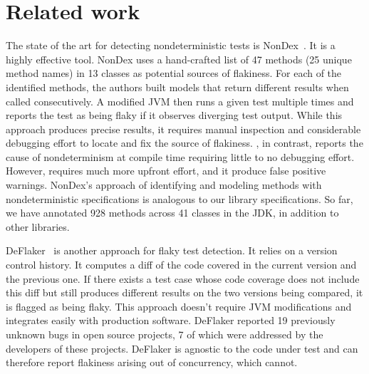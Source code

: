 \section{Related work}\label{sec:related}

The state of the art for detecting nondeterministic tests is NonDex~\cite{nondex}.  It is a highly effective tool.
NonDex uses a hand-crafted list of 47 methods (25 unique method names)
in 13 classes as potential sources of flakiness. 
For each of the identified methods, the authors built models that
return different results when called consecutively. A modified JVM then
runs a given test multiple times and reports the test as being flaky if it observes
diverging test output. While this approach produces precise results, it requires manual inspection
and considerable debugging effort to locate and fix the source of flakiness. \TheDeterminismChecker, in
contrast, reports the cause of nondeterminism at compile time requiring
little to no debugging effort.  However, \theDeterminismChecker requires
much more upfront effort, and it produce false positive warnings.
NonDex's approach of identifying and modeling methods with nondeterministic
specifications is analogous to our library specifications. So far, we have annotated
928 methods across 41 classes in the JDK, in addition to other libraries.

DeFlaker~\cite{deflaker} is another approach for flaky test detection. It
relies on a
version control history. It computes a diff of the code covered
in the current version and the previous one. If there exists a test case whose code coverage does not include
this diff but still produces different results on the two versions being compared, it is flagged as being flaky.
This approach doesn't require JVM modifications
and integrates easily with production software. DeFlaker reported 19 previously unknown bugs
in open source projects, 7 of which were addressed by the developers of these projects. DeFlaker is agnostic
to the code under test and can therefore report flakiness arising out of concurrency, which \theDeterminismChecker cannot.

